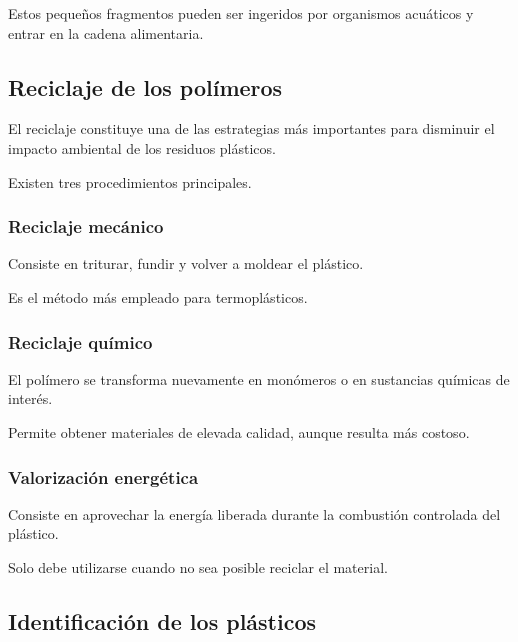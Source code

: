 Estos pequeños fragmentos pueden ser ingeridos por organismos acuáticos y entrar en
la cadena alimentaria.


\subsection{Reciclaje de los polímeros}

El reciclaje constituye una de las estrategias más importantes para disminuir el
impacto ambiental de los residuos plásticos.

Existen tres procedimientos principales.

\subsubsection*{Reciclaje mecánico}

Consiste en triturar, fundir y volver a moldear el plástico.

Es el método más empleado para termoplásticos.

\vspace{0.3cm}

\subsubsection*{Reciclaje químico}

El polímero se transforma nuevamente en monómeros o en sustancias químicas de interés.

Permite obtener materiales de elevada calidad, aunque resulta más costoso.

\vspace{0.3cm}

\subsubsection*{Valorización energética}

Consiste en aprovechar la energía liberada durante la combustión controlada del
plástico.

Solo debe utilizarse cuando no sea posible reciclar el material.


\subsection{Identificación de los plásticos}

